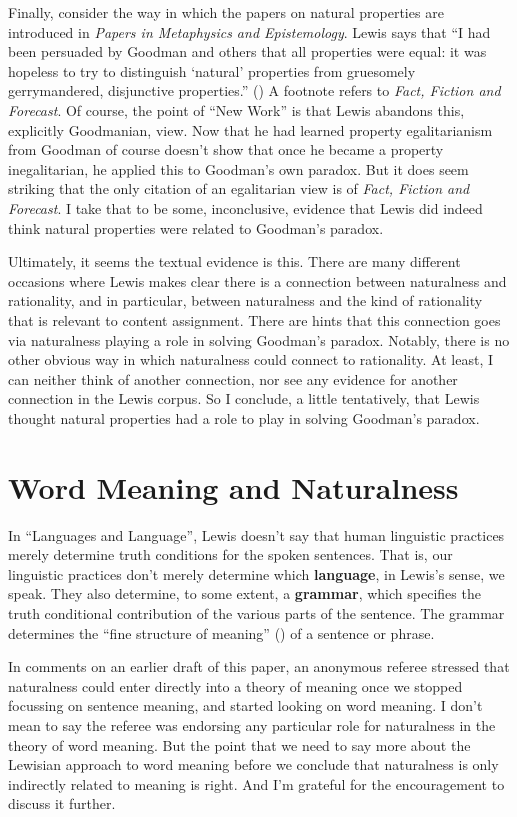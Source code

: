 \documentclass[
  11pt,
  letterpaper,
  DIV=11,
  numbers=noendperiod,
  twoside]{scrartcl}
\begin{document}
Finally, consider the way in which the papers on natural properties are
introduced in \emph{Papers in Metaphysics and Epistemology}. Lewis says
that ``I had been persuaded by Goodman and others that all properties
were equal: it was hopeless to try to distinguish `natural' properties
from gruesomely gerrymandered, disjunctive properties.''
() A footnote refers to
\emph{Fact, Fiction and Forecast}. Of course, the point of ``New Work''
is that Lewis abandons this, explicitly Goodmanian, view. Now that he
had learned property egalitarianism from Goodman of course doesn't show
that once he became a property inegalitarian, he applied this to
Goodman's own paradox. But it does seem striking that the only citation
of an egalitarian view is of \emph{Fact, Fiction and Forecast}. I take
that to be some, inconclusive, evidence that Lewis did indeed think
natural properties were related to Goodman's paradox.

Ultimately, it seems the textual evidence is this. There are many
different occasions where Lewis makes clear there is a connection
between naturalness and rationality, and in particular, between
naturalness and the kind of rationality that is relevant to content
assignment. There are hints that this connection goes via naturalness
playing a role in solving Goodman's paradox. Notably, there is no other
obvious way in which naturalness could connect to rationality. At least,
I can neither think of another connection, nor see any evidence for
another connection in the Lewis corpus. So I conclude, a little
tentatively, that Lewis thought natural properties had a role to play in
solving Goodman's paradox.

\section{Word Meaning and
Naturalness}\label{word-meaning-and-naturalness}

In ``Languages and Language'', Lewis doesn't say that human linguistic
practices merely determine truth conditions for the spoken sentences.
That is, our linguistic practices don't merely determine which
\textbf{language}, in Lewis's sense, we speak. They also determine, to
some extent, a \textbf{grammar}, which specifies the truth conditional
contribution of the various parts of the sentence. The grammar
determines the ``fine structure of meaning''
() of a sentence or phrase.

In comments on an earlier draft of this paper, an anonymous referee
stressed that naturalness could enter directly into a theory of meaning
once we stopped focussing on sentence meaning, and started looking on
word meaning. I don't mean to say the referee was endorsing any
particular role for naturalness in the theory of word meaning. But the
point that we need to say more about the Lewisian approach to word
meaning before we conclude that naturalness is only indirectly related
to meaning is right. And I'm grateful for the encouragement to discuss
it further.
\end{document}
